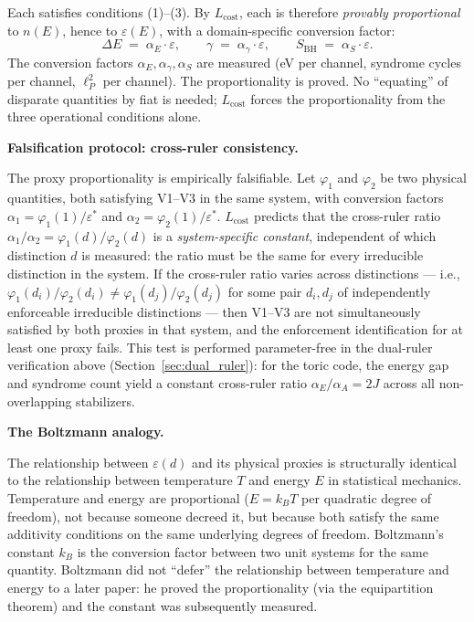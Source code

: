 \documentclass[11pt]{article}
\theoremstyle{remark}
\begin{document}
\smallskip\noindent Each satisfies conditions (1)--(3).  By $L_{\mathrm{cost}}$, each is therefore \emph{provably proportional} to $n(E)$, hence to $\varepsilon(E)$, with a domain-specific conversion factor:
\[
\Delta E \;=\; \alpha_E \cdot \varepsilon, \qquad \gamma \;=\; \alpha_\gamma \cdot \varepsilon, \qquad S_{\mathrm{BH}} \;=\; \alpha_S \cdot \varepsilon.
\]
The conversion factors $\alpha_E, \alpha_\gamma, \alpha_S$ are measured (eV per channel, syndrome cycles per channel, $\ell_P^2$ per channel).  The proportionality is proved.  No ``equating'' of disparate quantities by fiat is needed; $L_{\mathrm{cost}}$ forces the proportionality from the three operational conditions alone.

\medskip\noindent\textbf{Falsification protocol: cross-ruler consistency.}

The proxy proportionality is empirically falsifiable.  Let $\varphi_1$ and $\varphi_2$ be two physical quantities, both satisfying V1--V3 in the same system, with conversion factors $\alpha_1 = \varphi_1(1)/\varepsilon^*$ and $\alpha_2 = \varphi_2(1)/\varepsilon^*$.  $L_{\mathrm{cost}}$ predicts that the cross-ruler ratio $\alpha_1/\alpha_2 = \varphi_1(d)/\varphi_2(d)$ is a \emph{system-specific constant}, independent of which distinction $d$ is measured: the ratio must be the same for every irreducible distinction in the system.  If the cross-ruler ratio varies across distinctions --- i.e., $\varphi_1(d_i)/\varphi_2(d_i) \ne \varphi_1(d_j)/\varphi_2(d_j)$ for some pair $d_i, d_j$ of independently enforceable irreducible distinctions --- then V1--V3 are not simultaneously satisfied by both proxies in that system, and the enforcement identification for at least one proxy fails.  This test is performed parameter-free in the dual-ruler verification above (Section~\ref{sec:dual_ruler}): for the toric code, the energy gap and syndrome count yield a constant cross-ruler ratio $\alpha_E/\alpha_A = 2J$ across all non-overlapping stabilizers.

\medskip\noindent\textbf{The Boltzmann analogy.}

The relationship between $\varepsilon(d)$ and its physical proxies is structurally identical to the relationship between temperature $T$ and energy $E$ in statistical mechanics.  Temperature and energy are proportional ($E = k_B T$ per quadratic degree of freedom), not because someone decreed it, but because both satisfy the same additivity conditions on the same underlying degrees of freedom.  Boltzmann's constant $k_B$ is the conversion factor between two unit systems for the same quantity.  Boltzmann did not ``defer'' the relationship between temperature and energy to a later paper: he proved the proportionality (via the equipartition theorem) and the constant was subsequently measured.
\end{document}
